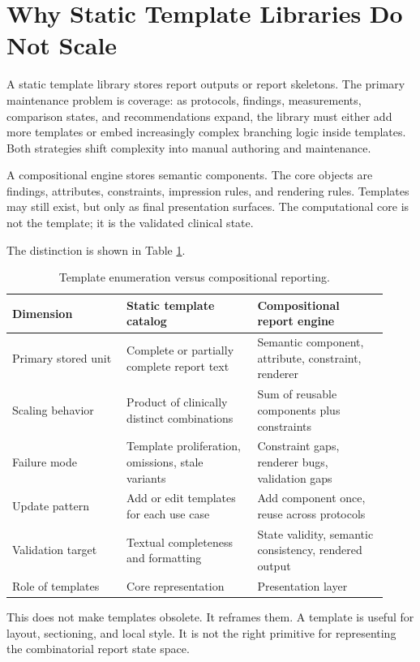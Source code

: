 \documentclass[11pt]{article}
\begin{document}
\section{Why Static Template Libraries Do Not Scale}

A static template library stores report outputs or report skeletons. The primary maintenance problem is coverage: as protocols, findings, measurements, comparison states, and recommendations expand, the library must either add more templates or embed increasingly complex branching logic inside templates. Both strategies shift complexity into manual authoring and maintenance.

A compositional engine stores semantic components. The core objects are findings, attributes, constraints, impression rules, and rendering rules. Templates may still exist, but only as final presentation surfaces. The computational core is not the template; it is the validated clinical state.

The distinction is shown in Table \ref{tab:paradigms}.

\begin{table}[ht]
\centering
\caption{Template enumeration versus compositional reporting.}
\label{tab:paradigms}
\begin{tabular}{p{0.28\linewidth}p{0.32\linewidth}p{0.32\linewidth}}
\toprule
Dimension & Static template catalog & Compositional report engine \\
\midrule
Primary stored unit & Complete or partially complete report text & Semantic component, attribute, constraint, renderer \\
Scaling behavior & Product of clinically distinct combinations & Sum of reusable components plus constraints \\
Failure mode & Template proliferation, omissions, stale variants & Constraint gaps, renderer bugs, validation gaps \\
Update pattern & Add or edit templates for each use case & Add component once, reuse across protocols \\
Validation target & Textual completeness and formatting & State validity, semantic consistency, rendered output \\
Role of templates & Core representation & Presentation layer \\
\bottomrule
\end{tabular}
\end{table}

This does not make templates obsolete. It reframes them. A template is useful for layout, sectioning, and local style. It is not the right primitive for representing the combinatorial report state space.
\end{document}
